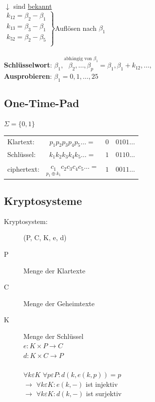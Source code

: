 \documentclass[10pt]{article}
\newcommand{\T}[1]{\text{#1}} %
\newcommand{\ra}{\rightarrow}
\newcommand{\Brackar}[2]{\left.\begin{array}{#1} #2 \end{array}\right\rbrace} %
\newcommand{\Oben}[2]{\overset{#1}{#2}} %
\newcommand{\Unten}[2]{\underset{#1}{#2}} %
\begin{document}
\begin{description}
		\hspace*{.2cm}$\downarrow$ sind \underline{bekannt}\\
		$\Brackar{c}{
		k_{12}=\beta_2-\beta_1\\
		k_{13}=\beta_3-\beta_1\\
		k_{52}=\beta_2-\beta_5\\
		}$Auflösen nach $\beta_1$\\\\
		\textbf{Schlüsselwort}: $\beta_1,\Oben{\T{abhängig von }\beta_1}{\beta_2,\dots,\beta_p}=\beta_1,\beta_1+k_{12},\dots,$ \\ 
		\textbf{Ausprobieren}: $\beta_1 = 0,1,\dots, 25$

\end{description}
\subsection{One-Time-Pad}
$\Sigma=\{0,1\}$
\begin{tabular}{lc|c|l}\cline{3-3}
Klartext:& $p_1p_2p_3p_4p_5\dots=$&$0$&$0101\dots$\\
Schlüssel:& $k_1k_2k_3k_4k_5\dots=$&$1$&$0110\dots$\\
ciphertext:& $\Unten{p_1\oplus k_1}{c_1}c_2c_3c_4c_5\dots=$&$1$&$0011\dots$\\\cline{3-3}
\end{tabular}
\subsection{Kryptosysteme}
\begin{description}
	\item[Kryptosystem:] (P, C, K, e, d)
	\item[P] Menge der {\color{blue}Klartexte}
	\item[C] Menge der {\color{red}Geheimtexte}
	\item[K] Menge der Schlüssel \\
		$e:K\times P \ra C$ \\
		$d:K\times C \ra P$ \\ \\
		$\forall k \varepsilon K$ $\forall p \varepsilon P: d( k, e (k,p))=p$ \\
		$\ra$ $\forall k \varepsilon K : e (k,-)$ ist {\color{blue}injektiv} \\
		$\ra$ $\forall k \varepsilon K : d (k,-)$ ist {\color{red}surjektiv} \\
\end{description}
\end{document}
